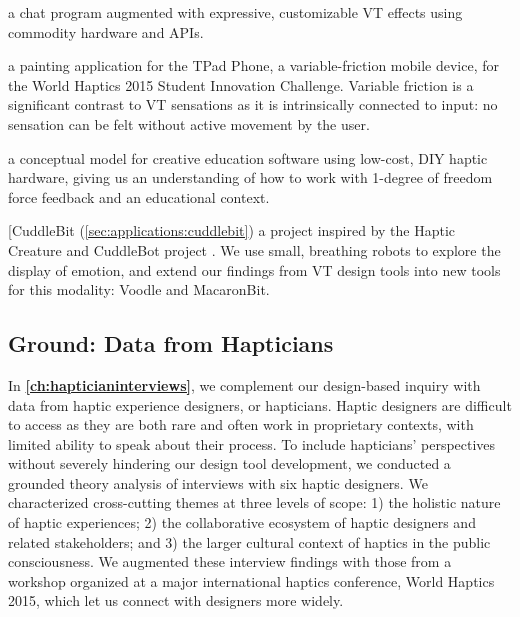  a chat program augmented with expressive, customizable VT effects using commodity hardware and APIs.
	
  a painting application for the TPad Phone, a variable-friction mobile device, for the World Haptics 2015 Student Innovation Challenge. 
	Variable friction is a significant contrast to VT sensations as it is intrinsically connected to input: no sensation can be felt without active movement by the user.
	
 a conceptual model for creative education software using low-cost, DIY haptic hardware, giving us an understanding of how to work with 1-degree of freedom force feedback and an educational context.

\inlineHeading[{CuddleBit (\autoref{sec:applications:cuddlebit})} a project inspired by the Haptic Creature \cite{Yohanan2011affectivetouch,Yohanan2011affectdisplay,Chang2010} and CuddleBot project \cite{Allen2015cuddlebot}.
	We use small, breathing robots to explore the display of emotion, and extend our findings from VT design tools into new tools for this modality: Voodle and MacaronBit.





\subsection{Ground: Data from Hapticians}
In \textbf{\autoref{ch:hapticianinterviews}}, we complement our design-based inquiry with data from haptic experience designers, or  hapticians.
Haptic designers are difficult to access as they are both rare and often work in proprietary contexts, with limited ability to speak about their process.
To include hapticians' perspectives without severely hindering our design tool development, we conducted a grounded theory analysis of interviews with six haptic designers.
We characterized cross-cutting themes at three levels of scope: 1) the holistic nature of haptic experiences; 2) the collaborative ecosystem of haptic designers and related stakeholders; and 3) the larger cultural context of haptics in the public consciousness.
We augmented these interview findings with those from a workshop  organized at a major international haptics conference, World Haptics 2015, which let us connect with designers more widely.

